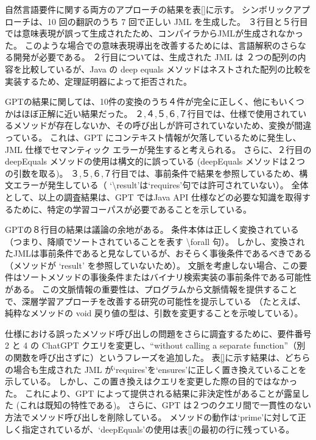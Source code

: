 \documentclass[uplatex, twocolumn,10pt]{jsarticle} %
\begin{document}
自然言語要件に関する両方のアプローチの結果を表\ref{}に示す。
シンボリックアプローチは、10 回の翻訳のうち 7 回で正しい JML を生成した。
３行目と５行目では意味表現が誤って生成されたため、コンパイラからJMLが生成されなかった。
このような場合での意味表現導出を改善するためには、言語解釈のさらなる開発が必要である。
２行目については、生成された JML は ２つの配列の内容を比較しているが、Java の deep equals メソッドはネストされた配列の比較を実装するため、定理証明器によって拒否された。

GPTの結果に関しては、10件の変換のうち４件が完全に正しく、他にもいくつかはほぼ正解に近い結果だった。
２,４,５,６,７行目では、仕様で使用されているメソッドが存在しないか、その呼び出しが許可されていないため、変換が間違っている。
これは、GPT にコンテキスト情報が欠落しているために発生し、JML 仕様でセマンティック エラーが発生すると考えられる。
さらに、２行目の deepEquals メソッドの使用は構文的に誤っている (deepEquals メソッドは２つの引数を取る)。
３,５,６,７行目では、事前条件で結果を参照しているため、構文エラーが発生している（ ‘\textbackslash result'は‘requires'句では許可されていない）。
全体として、以上の調査結果は、GPT ではJava API 仕様などの必要な知識を取得するために、特定の学習コーパスが必要であることを示している。

GPTの８行目の結果は議論の余地がある。
条件本体は正しく変換されている （つまり、降順でソートされていることを表す \textbackslash forall 句）。
しかし、変換されたJMLは事前条件であると見なしているが、おそらく事後条件であるべきである（メソッドが ‘result' を参照していないため）。
文脈を考慮しない場合、この要件はソートメソッドの事後条件またはバイナリ検索実装の事前条件である可能性がある。
この文脈情報の重要性は、プログラムから文脈情報を提供することで、深層学習アプローチを改善する研究の可能性を提示している
（たとえば、純粋なメソッドの void 戻り値の型は、引数を変更することを示唆している）。

仕様における誤ったメソッド呼び出しの問題をさらに調査するために、要件番号 2 と 4 の ChatGPT クエリを変更し、“without calling a separate function”（別の関数を呼び出さずに）というフレーズを追加した。
表\ref{}に示す結果は、どちらの場合も生成された JML が‘requires'を‘ensures'に正しく置き換えていることを示している。
しかし、この置き換えはクエリを変更した際の目的ではなかった。
これにより、GPT によって提供される結果に非決定性があることが露呈した (これは既知の特性である)。
さらに、GPT は２つのクエリ間で一貫性のない方法でメソッド呼び出しを削除している。
メソッドの動作は‘prime'に対して正しく指定されているが、‘deepEquals'の使用は表\ref{}の最初の行に残っている。
\end{document}
